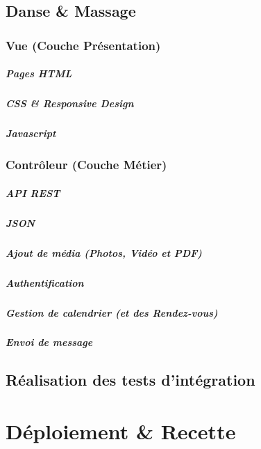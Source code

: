 \documentclass[11pt,a4paper]{report}
\begin{document}
	\section{Danse \& Massage}
		\subsection{Vue (Couche Présentation)}
			\paragraph{Pages HTML}
			\paragraph{CSS \& Responsive Design}
			\paragraph{Javascript}
		\subsection{Contrôleur (Couche Métier)}
			\paragraph{API REST}
			\paragraph{JSON}
			\paragraph{Ajout de média (Photos, Vidéo et PDF)}
			\paragraph{Authentification}
			\paragraph{Gestion de calendrier (et des Rendez-vous)}
			\paragraph{Envoi de message}
	\section{Réalisation des tests d'intégration}

\chapter{Déploiement \& Recette}
\end{document}
